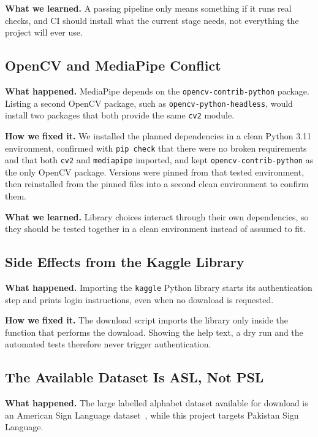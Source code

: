 \textbf{What we learned.} A passing pipeline only means something if it runs real checks, and CI should install what the current stage needs, not everything the project will ever use.

\subsection{OpenCV and MediaPipe Conflict}

\textbf{What happened.} MediaPipe depends on the \texttt{opencv-contrib-python} package. Listing a second OpenCV package, such as \texttt{opencv-python-headless}, would install two packages that both provide the same \texttt{cv2} module.

\textbf{How we fixed it.} We installed the planned dependencies in a clean Python 3.11 environment, confirmed with \texttt{pip check} that there were no broken requirements and that both \texttt{cv2} and \texttt{mediapipe} imported, and kept \texttt{opencv-contrib-python} as the only OpenCV package. Versions were pinned from that tested environment, then reinstalled from the pinned files into a second clean environment to confirm them.

\textbf{What we learned.} Library choices interact through their own dependencies, so they should be tested together in a clean environment instead of assumed to fit.

\subsection{Side Effects from the Kaggle Library}

\textbf{What happened.} Importing the \texttt{kaggle} Python library starts its authentication step and prints login instructions, even when no download is requested.

\textbf{How we fixed it.} The download script imports the library only inside the function that performs the download. Showing the help text, a dry run and the automated tests therefore never trigger authentication.

\subsection{The Available Dataset Is ASL, Not PSL}

\textbf{What happened.} The large labelled alphabet dataset available for download is an American Sign Language dataset~\cite{asl_alphabet_kaggle}, while this project targets Pakistan Sign Language.

